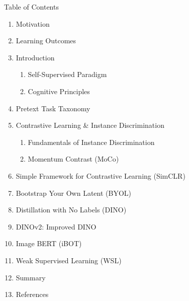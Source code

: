 \begin{frame}[allowframebreaks]{Table of Contents}
\begin{enumerate}
    \item Motivation
    \item Learning Outcomes
    \item Introduction
        \begin{enumerate}
            \item Self-Supervised Paradigm
            \item Cognitive Principles
        \end{enumerate}
    \item Pretext Task Taxonomy
    \item Contrastive Learning \& Instance Discrimination
        \begin{enumerate}
            \item Fundamentals of Instance Discrimination
            \item Momentum Contrast (MoCo)
        \end{enumerate}
    \item Simple Framework for Contrastive Learning (SimCLR)
    \item Bootstrap Your Own Latent (BYOL)
    \item Distillation with No Labels (DINO)
    \item DINOv2: Improved DINO
    \item Image BERT (iBOT)
    \item Weak Supervised Learning (WSL)
    \item Summary
    \item References
\end{enumerate}
\end{frame}